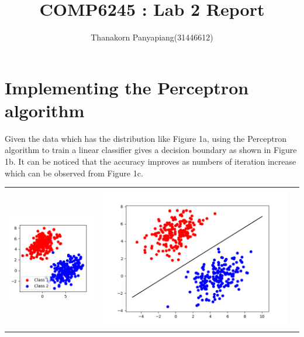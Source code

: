 \documentclass{article}
\title{COMP6245 : Lab 2 Report}
\author{Thanakorn Panyapiang(31446612)}
\date{}
\begin{document}
\maketitle

\section{Implementing the Perceptron algorithm}
Given the data which has the distribution like Figure 1a, using the Perceptron algorithm to train a linear classifier gives a decision boundary as shown in Figure 1b. It can be noticed that the accuracy improves as numbers of iteration increase which can be observed from Figure 1c.
\begin{center}
\begin{tabular}{ccc}
\includegraphics[scale=0.3]{scatter_sample1} &
\includegraphics[scale=0.2]{sample1_decision_doundary} &

\end{tabular}
\end{center}
\end{document}
